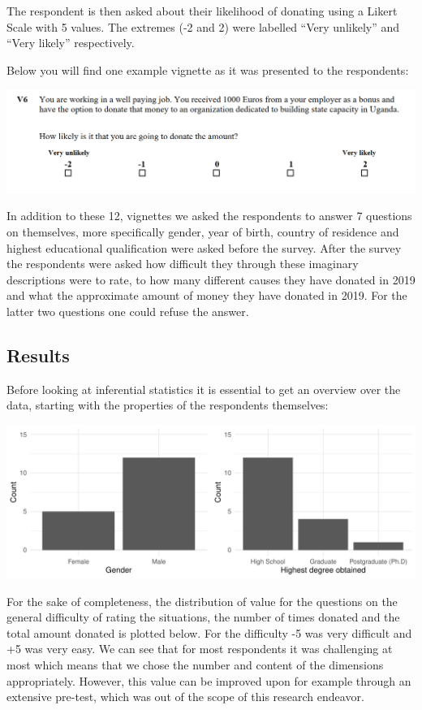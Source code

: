 \documentclass[
  12pt,
]{article}
\begin{document}
The respondent is then asked about their likelihood of donating using a
Likert Scale with 5 values. The extremes (-2 and 2) were labelled ``Very
unlikely'' and ``Very likely'' respectively.

Below you will find one example vignette as it was presented to the
respondents:

\includegraphics[width=1.05\linewidth]{Screenshot_vignette}

In addition to these 12, vignettes we asked the respondents to answer 7
questions on themselves, more specifically gender, year of birth,
country of residence and highest educational qualification were asked
before the survey. After the survey the respondents were asked how
difficult they through these imaginary descriptions were to rate, to how
many different causes they have donated in 2019 and what the approximate
amount of money they have donated in 2019. For the latter two questions
one could refuse the answer.

\hypertarget{results}{%
\subsection{Results}\label{results}}

Before looking at inferential statistics it is essential to get an
overview over the data, starting with the properties of the respondents
themselves:

\includegraphics[width=1.05\linewidth]{FSE_paper_files/figure-latex/unnamed-chunk-2-1}

For the sake of completeness, the distribution of value for the
questions on the general difficulty of rating the situations, the number
of times donated and the total amount donated is plotted below. For the
difficulty -5 was very difficult and +5 was very easy. We can see that
for most respondents it was challenging at most which means that we
chose the number and content of the dimensions appropriately. However,
this value can be improved upon for example through an extensive
pre-test, which was out of the scope of this research endeavor.
\end{document}
